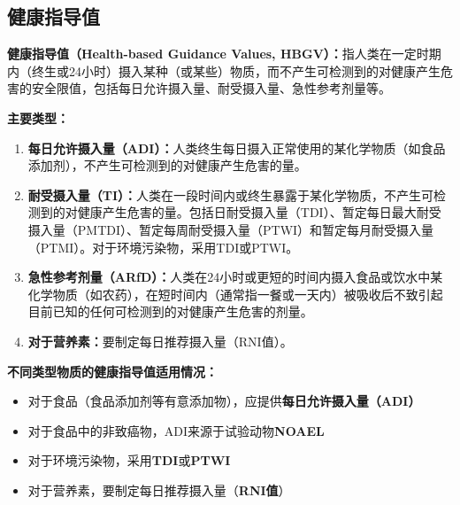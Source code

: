 \subsection{健康指导值}

\begin{defbox}
\textbf{健康指导值（Health-based Guidance Values, HBGV）：}指人类在一定时期内（终生或24小时）摄入某种（或某些）物质，而不产生可检测到的对健康产生危害的安全限值，包括每日允许摄入量、耐受摄入量、急性参考剂量等。

\textbf{主要类型：}
\begin{enumerate}[leftmargin=*]
    \item \textbf{每日允许摄入量（ADI）：}人类终生每日摄入正常使用的某化学物质（如食品添加剂），不产生可检测到的对健康产生危害的量。
    \item \textbf{耐受摄入量（TI）：}人类在一段时间内或终生暴露于某化学物质，不产生可检测到的对健康产生危害的量。包括日耐受摄入量（TDI）、暂定每日最大耐受摄入量（PMTDI）、暂定每周耐受摄入量（PTWI）和暂定每月耐受摄入量（PTMI）。对于环境污染物，采用TDI或PTWI。
    \item \textbf{急性参考剂量（ARfD）：}人类在24小时或更短的时间内摄入食品或饮水中某化学物质（如农药），在短时间内（通常指一餐或一天内）被吸收后不致引起目前已知的任何可检测到的对健康产生危害的剂量。
    \item \textbf{对于营养素：}要制定每日推荐摄入量（RNI值）。
\end{enumerate}

\textbf{不同类型物质的健康指导值适用情况：}
\begin{itemize}[leftmargin=*]
    \item 对于食品（食品添加剂等有意添加物），应提供\textbf{每日允许摄入量（ADI）}
    \item 对于食品中的非致癌物，ADI来源于试验动物\textbf{NOAEL}
    \item 对于环境污染物，采用\textbf{TDI}或\textbf{PTWI}
    \item 对于营养素，要制定每日推荐摄入量（\textbf{RNI值}）
\end{itemize}
\end{defbox}


